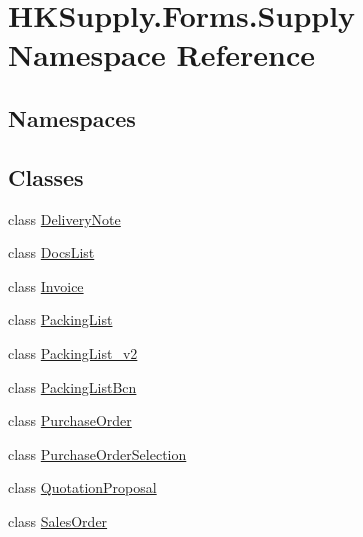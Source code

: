 \hypertarget{namespace_h_k_supply_1_1_forms_1_1_supply}{}\section{H\+K\+Supply.\+Forms.\+Supply Namespace Reference}
\label{namespace_h_k_supply_1_1_forms_1_1_supply}
\subsection*{Namespaces}
\begin{DoxyCompactItemize}
\end{DoxyCompactItemize}
\subsection*{Classes}
\begin{DoxyCompactItemize}
\item 
class \mbox{\hyperlink{class_h_k_supply_1_1_forms_1_1_supply_1_1_delivery_note}{Delivery\+Note}}
\item 
class \mbox{\hyperlink{class_h_k_supply_1_1_forms_1_1_supply_1_1_docs_list}{Docs\+List}}
\item 
class \mbox{\hyperlink{class_h_k_supply_1_1_forms_1_1_supply_1_1_invoice}{Invoice}}
\item 
class \mbox{\hyperlink{class_h_k_supply_1_1_forms_1_1_supply_1_1_packing_list}{Packing\+List}}
\item 
class \mbox{\hyperlink{class_h_k_supply_1_1_forms_1_1_supply_1_1_packing_list__v2}{Packing\+List\+\_\+v2}}
\item 
class \mbox{\hyperlink{class_h_k_supply_1_1_forms_1_1_supply_1_1_packing_list_bcn}{Packing\+List\+Bcn}}
\item 
class \mbox{\hyperlink{class_h_k_supply_1_1_forms_1_1_supply_1_1_purchase_order}{Purchase\+Order}}
\item 
class \mbox{\hyperlink{class_h_k_supply_1_1_forms_1_1_supply_1_1_purchase_order_selection}{Purchase\+Order\+Selection}}
\item 
class \mbox{\hyperlink{class_h_k_supply_1_1_forms_1_1_supply_1_1_quotation_proposal}{Quotation\+Proposal}}
\item 
class \mbox{\hyperlink{class_h_k_supply_1_1_forms_1_1_supply_1_1_sales_order}{Sales\+Order}}
\end{DoxyCompactItemize}
